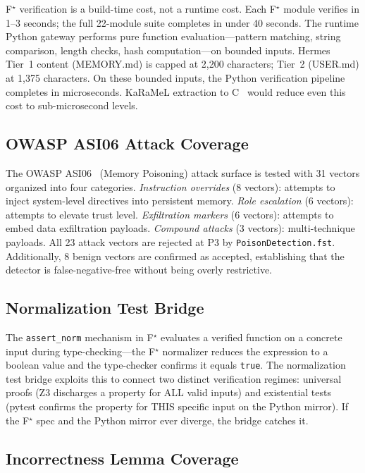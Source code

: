 \documentclass[sigplan,screen,nonacm]{acmart}
\newcommand{\fstar}{F\ensuremath{^\star}}
\begin{document}
\fstar{} verification is a build-time cost, not a runtime cost. Each
\fstar{} module verifies in 1--3 seconds; the full 22-module suite
completes in under 40 seconds. The runtime Python gateway performs pure
function evaluation---pattern matching, string comparison, length checks,
hash computation---on bounded inputs. Hermes Tier~1 content (MEMORY.md) is
capped at 2{,}200 characters; Tier~2 (USER.md) at 1{,}375 characters. On
these bounded inputs, the Python verification pipeline completes in
microseconds. KaRaMeL extraction to C~\cite{protzenko2017verified} would
reduce even this cost to sub-microsecond levels.

\subsection{OWASP ASI06 Attack Coverage}

The OWASP ASI06~\cite{owasp2026asi06} (Memory Poisoning) attack surface is
tested with 31 vectors organized into four categories.
\emph{Instruction overrides} (8 vectors): attempts to inject system-level
directives into persistent memory. \emph{Role escalation} (6 vectors):
attempts to elevate trust level. \emph{Exfiltration markers} (6 vectors):
attempts to embed data exfiltration payloads. \emph{Compound attacks} (3
vectors): multi-technique payloads. All 23 attack vectors are rejected at P3
by \texttt{PoisonDetection.fst}. Additionally, 8 benign vectors are
confirmed as accepted, establishing that the detector is false-negative-free
without being overly restrictive.

\subsection{Normalization Test Bridge}

The \texttt{assert\_norm} mechanism in \fstar{} evaluates a verified
function on a concrete input during type-checking---the \fstar{} normalizer
reduces the expression to a boolean value and the type-checker confirms it
equals \texttt{true}. The normalization test bridge exploits this to connect
two distinct verification regimes: universal proofs (Z3 discharges a
property for ALL valid inputs) and existential tests (pytest confirms the
property for THIS specific input on the Python mirror). If the \fstar{} spec
and the Python mirror ever diverge, the bridge catches it.

\subsection{Incorrectness Lemma Coverage}
\end{document}
